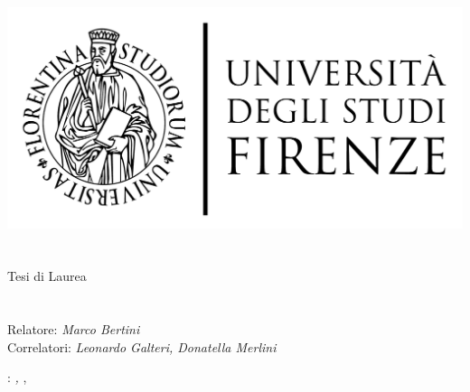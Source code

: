 \begin{titlepage}
	\begin{center}
   	\large
      \hfill
      \vfill
      \begingroup
         \includegraphics[scale=0.15]{static/logo/LOGO}\\
			\myFaculty \\
			\myDegree \\ 
			\vspace{0.5cm}
         \vspace{0.5cm}    
         Tesi di Laurea    
      \endgroup 
      \vfill 
      \begingroup
      	\color{Maroon}\spacedallcaps{\myItalianTitle} \\ $\ $\\
      	\spacedallcaps{\myEnglishTitle} \\ 	
	\bigskip
      \endgroup
      \spacedlowsmallcaps{\myName}
      \vfill 
      \vfill
      Relatore: \emph{Marco Bertini}\\
      Correlatori: \emph{Leonardo Galteri, Donatella Merlini}\\
      \vfill
      \vfill
      \myTime
      \vfill                      
	\end{center}        
\end{titlepage}   
   \newpage
	\thispagestyle{empty}
	\hfill
	\vfill
	\noindent\myName: 
	\textit{\myItalianTitle,} 
	\myDegree, \textcopyright\ \myTime
